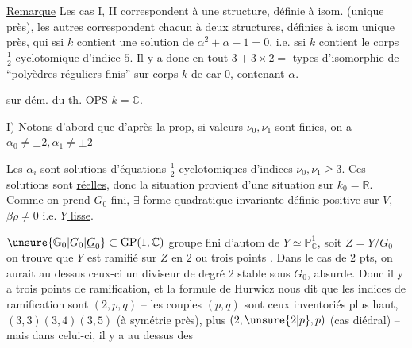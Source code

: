 \uline{Remarque} Les cas I, II  correspondent  à une structure, définie à isom. (unique près),  les autres  correspondent chacun à deux structures, définies à isom unique près,  qui  ssi $k$ contient une solution de $\alpha^2+\alpha-1=0$, i.e. ssi $k$ contient le corps $\tfrac12$ cyclotomique d'indice $5$. Il y a donc en tout $3+3\times2=$ types d'isomorphie de ``polyèdres réguliers finis'' sur corps $k$ de car $0$, contenant $\alpha$.

\uline{ sur dém. du th.}  OPS  $k=\mathbb C$.

I) Notons d'abord que d'après la prop, si valeurs $\nu_0,\nu_1$ sont finies, on a  $\alpha_0\ne\pm2,\alpha_1\ne\pm2$


Les $\alpha_i$ sont solutions d'équations $\tfrac12$-cyclotomiques d'indices $\nu_0,\nu_1\geq3$. Ces solutions sont \uline{réelles}, donc la situation provient d'une situation sur $k_0=\mathbb R$. Comme on prend $G_0$  fini, $\exists$ forme quadratique invariante définie positive sur $V$,  $\boxed{\beta\rho\ne0}$ i.e. \uline{$Y$ lisse}.

$\unsure{\mathbb G_0|G_0|\underline G_0}\subset\operatorname{GP}(1,\mathbb C)$ groupe fini d'autom de $Y\simeq\mathbb P^1_{\mathbb C}$,  soit $Z=Y/G_0$    on trouve que $Y$ est ramifié sur $Z$ en $2$ ou trois points . Dans le cas de $2$ pts, on aurait au dessus  ceux-ci un diviseur de degré $2$ stable sous $G_0$, absurde. Donc il y a trois points de ramification, et la formule de Hurwicz nous dit que les  indices de ramification sont $(2,p,q)$ -- les couples $(p,q)$ sont  ceux inventoriés plus haut,  $(3,3)(3,4)(3,5)$  (à  symétrie près), plus $(2,\unsure{2|p},p)$ (cas diédral) -- mais dans celui-ci, il y a au dessus des

